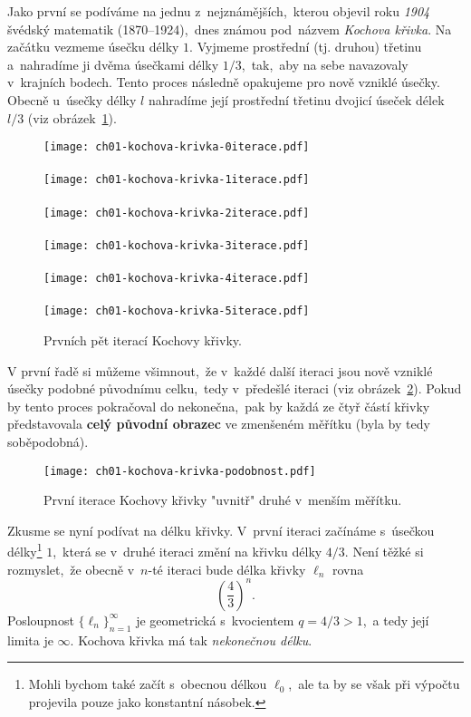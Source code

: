 Jako první se podíváme na jednu z~nejznámějších,~kterou objevil roku \emph{1904} švédský matematik  \mbox{(1870--1924)},~dnes známou pod~názvem \emph{Kochova křivka}. \citep[str. 61]{Peitgen2004} Na začátku vezmeme úsečku délky $1$. Vyjmeme prostřední (tj. druhou) třetinu a~nahradíme ji dvěma úsečkami délky $1/3$,~tak,~aby na sebe navazovaly v~krajních bodech. Tento proces následně opakujeme pro nově vzniklé úsečky. Obecně u~úsečky délky $l$ nahradíme její prostřední třetinu dvojicí úseček délek $l/3$ (viz obrázek~\ref{fig:kochova_vlocka_5iteraci}).
\begin{figure}[h]
    \centering
    \texttt{[image: ch01-kochova-krivka-0iterace.pdf]}\\\qquad\\
    \texttt{[image: ch01-kochova-krivka-1iterace.pdf]}\\\qquad\\
    \texttt{[image: ch01-kochova-krivka-2iterace.pdf]}\\\qquad\\
    \texttt{[image: ch01-kochova-krivka-3iterace.pdf]}\\\qquad\\
    \texttt{[image: ch01-kochova-krivka-4iterace.pdf]}\\\qquad\\
    \texttt{[image: ch01-kochova-krivka-5iterace.pdf]}
    \caption{Prvních pět iterací Kochovy křivky.}
    \label{fig:kochova_vlocka_5iteraci}
\end{figure}
V první řadě si můžeme všimnout,~že v~každé další iteraci jsou nově vzniklé úsečky podobné původnímu celku,~tedy v~předešlé iteraci (viz obrázek~\ref{fig:kochova_krivka_podobnost}). Pokud by tento proces pokračoval do nekonečna,~pak by každá ze čtyř částí křivky představovala \textbf{celý původní obrazec} ve zmenšeném měřítku (byla by tedy soběpodobná).
\begin{figure}[h]
    \centering
    \texttt{[image: ch01-kochova-krivka-podobnost.pdf]}
    \caption{První iterace Kochovy křivky "uvnitř" druhé v~menším měřítku.}
    \label{fig:kochova_krivka_podobnost}
\end{figure}
Zkusme se nyní podívat na délku křivky. V~první iteraci začínáme s~úsečkou délky\footnote{Mohli bychom také začít s~obecnou délkou $\ell_0$,~ale ta by se však při výpočtu projevila pouze jako konstantní násobek.} $1$,~která se v~druhé iteraci změní na křivku délky $4/3$. Není těžké si rozmyslet,~že obecně v~$n$-té iteraci bude délka křivky $\ell_n$ rovna
\begin{equation*}
    \left(\dfrac{4}{3}\right)^{n}.
\end{equation*}
Posloupnost $\{\ell_n\}_{n=1}^{\infty}$ je geometrická s~kvocientem $q=4/3>1$,~a tedy její limita je $\infty$. Kochova křivka má tak \emph{nekonečnou délku}.

